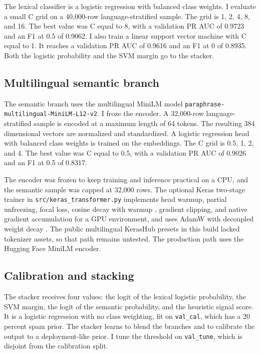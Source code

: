 \documentclass[11pt]{article}
\begin{document}
The lexical classifier is a logistic regression with balanced class weights. I evaluate a small C grid on a 40,000-row language-stratified sample. The grid is 1, 2, 4, 8, and 16. The best value was C equal to 8, with a validation PR AUC of 0.9723 and an F1 at 0.5 of 0.9062. I also train a linear support vector machine with C equal to 1. It reaches a validation PR AUC of 0.9616 and an F1 at 0 of 0.8935. Both the logistic probability and the SVM margin go to the stacker.

\subsection{Multilingual semantic branch}

The semantic branch uses the multilingual MiniLM model
\texttt{paraphrase-\allowbreak multilingual-\allowbreak MiniLM-\allowbreak L12-\allowbreak v2}.
I froze the encoder. A 32,000-row language-stratified sample is encoded at a maximum length of 64 tokens. The resulting 384 dimensional vectors are normalized and standardized. A logistic regression head with balanced class weights is trained on the embeddings. The C grid is 0.5, 1, 2, and 4. The best value was C equal to 0.5, with a validation PR AUC of 0.9026 and an F1 at 0.5 of 0.8317.

The encoder was frozen to keep training and inference practical on a CPU, and the semantic sample was capped at 32,000 rows. The optional Keras two-stage trainer in \texttt{src/keras\_transformer.py} implements head warmup, partial unfreezing, focal loss, cosine decay with warmup \cite{loshchilov2017}, gradient clipping, and native gradient accumulation for a GPU environment, and uses AdamW with decoupled weight decay \cite{loshchilov2019}. The public multilingual KerasHub presets in this build lacked tokenizer assets, so that path remains untested. The production path uses the Hugging Face MiniLM encoder.

\subsection{Calibration and stacking}

The stacker receives four values: the logit of the lexical logistic probability, the SVM margin, the logit of the semantic probability, and the heuristic signal score. It is a logistic regression with no class weighting, fit on \texttt{val\_cal}, which has a 20 percent spam prior. The stacker learns to blend the branches and to calibrate the output to a deployment-like prior. I tune the threshold on \texttt{val\_tune}, which is disjoint from the calibration split.
\end{document}
